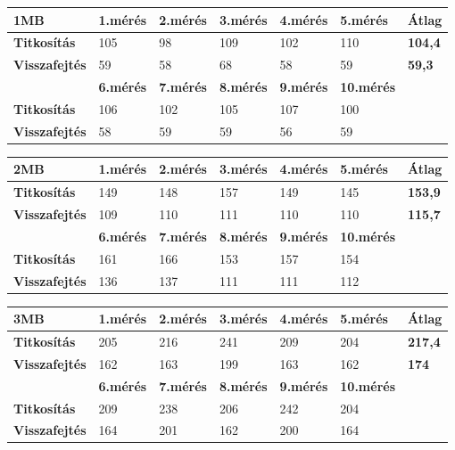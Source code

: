 \begin{center}
	
	
	\begin{tabular}{|p{2.4cm}|p{1.7cm}|p{1.7cm}|p{1.7cm}|p{1.7cm}|p{1.8cm}|p{1.2cm}|}
		\hline
		\textbf{1MB} & \textbf{1.mérés} & \textbf{2.mérés} & \textbf{3.mérés} & \textbf{4.mérés} & \textbf{5.mérés} & \textbf{Átlag} \\
		\hline
		\textbf{Titkosítás}&105&98&109&102&110&\textbf{104,4} \\
		\hline
		\textbf{Visszafejtés}&59&58&68&58&59&\textbf{59,3}  \\
		\hline
		& \textbf{6.mérés} & \textbf{7.mérés} & \textbf{8.mérés} & \textbf{9.mérés} & \textbf{10.mérés} & \\
		\hline
		\textbf{Titkosítás}&106&102&105&107&100& \\
		\hline
		\textbf{Visszafejtés}&58&59&59&56&59& \\
		\hline
	\end{tabular}
\end{center}

\begin{center}
	
	
	\begin{tabular}{|p{2.4cm}|p{1.7cm}|p{1.7cm}|p{1.7cm}|p{1.7cm}|p{1.8cm}|p{1.2cm}|}
		\hline
		\textbf{2MB} & \textbf{1.mérés} & \textbf{2.mérés} & \textbf{3.mérés} & \textbf{4.mérés} & \textbf{5.mérés} & \textbf{Átlag} \\
		\hline
		\textbf{Titkosítás}&149&148&157&149&145&\textbf{153,9}\\
		\hline
		\textbf{Visszafejtés}&109&110&111&110&110&\textbf{115,7} \\
		\hline
		& \textbf{6.mérés} & \textbf{7.mérés} & \textbf{8.mérés} & \textbf{9.mérés} & \textbf{10.mérés} & \\
		\hline
		\textbf{Titkosítás}&161&166&153&157&154& \\
		\hline
		\textbf{Visszafejtés}&136&137&111&111&112& \\
		\hline
	\end{tabular}
\end{center}

\begin{center}
	
	
	\begin{tabular}{|p{2.4cm}|p{1.7cm}|p{1.7cm}|p{1.7cm}|p{1.7cm}|p{1.8cm}|p{1.2cm}|}
		\hline
		\textbf{3MB} & \textbf{1.mérés} & \textbf{2.mérés} & \textbf{3.mérés} & \textbf{4.mérés} & \textbf{5.mérés} & \textbf{Átlag} \\
		\hline
		\textbf{Titkosítás}&205&216&241&209&204&\textbf{217,4}\\
		\hline
		\textbf{Visszafejtés}&162&163&199&163&162&\textbf{174}\\
		\hline
		& \textbf{6.mérés} & \textbf{7.mérés} & \textbf{8.mérés} & \textbf{9.mérés} & \textbf{10.mérés} & \\
		\hline
		\textbf{Titkosítás}&209&238&206&242&204& \\
		\hline
		\textbf{Visszafejtés}&164&201&162&200&164& \\
		\hline
	\end{tabular}
\end{center}

